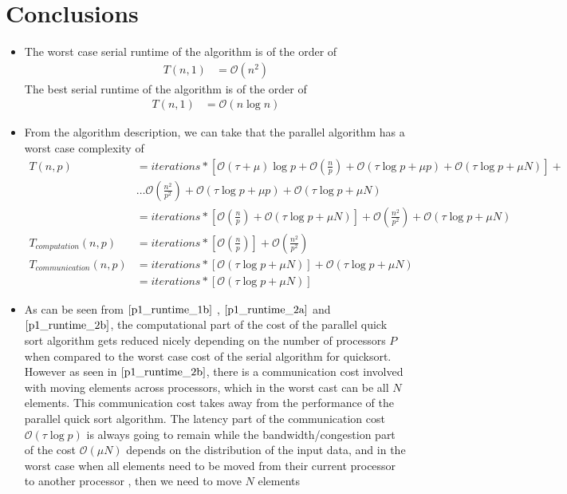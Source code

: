 \documentclass[twoside,11pt]{article}\usepackage{amsmath,amsfonts,amsthm,fullpage}
\begin{document}
\section{Conclusions}
\begin{itemize}
\item
The worst case serial runtime of the algorithm is of the order of
\begin{align}
T(n,1) &= \mathcal{O}(n^2)\label{p1_runtime_1}
\end{align}
The best serial runtime of the algorithm is of the order of
\begin{align}
T(n,1) &= \mathcal{O}(n \log n)\label{p1_runtime_1b}
\end{align}
\item
From the algorithm description, we can take that the parallel algorithm has a worst case complexity of
\begin{align}
T(n,p) &= iterations*[\mathcal{O}(\tau + \mu )\log p + \mathcal{O}(\frac{n}{p}) + \mathcal{O}(\tau \log p + \mu p ) +  \mathcal{O}(\tau \log p + \mu N )] + \nonumber\\
 &\dots \mathcal{O} (\frac{n^2}{p^2}) + \mathcal{O}(\tau \log p + \mu p ) + \mathcal{O}(\tau \log p + \mu N ) \nonumber\\
 &= iterations*[\mathcal{O}(\frac{n}{p}) + \mathcal{O}(\tau \log p + \mu N )] +  \mathcal{O} (\frac{n^2}{p^2}) + \mathcal{O}(\tau \log p + \mu N ) \label{p1_runtime_2}\\
 T_{computation}(n,p) &= iterations*[\mathcal{O}(\frac{n}{p}) ] +  \mathcal{O} (\frac{n^2}{p^2}) \label{p1_runtime_2a}\\
 T_{communication}(n,p) &= iterations*[\mathcal{O}(\tau \log p + \mu N )] + \mathcal{O}(\tau \log p + \mu N )\nonumber\\
 & =  iterations*[\mathcal{O}(\tau \log p + \mu N )] \label{p1_runtime_2b}
\end{align}
\item
As can be seen from $\eqref{p1_runtime_1b}$ , $\eqref{p1_runtime_2a}$ and $\eqref{p1_runtime_2b}$, the computational part of the cost of the parallel quick sort algorithm gets reduced nicely  depending on the number of processors $P$ when compared to the worst case cost of the serial algorithm for quicksort. However as seen in $\eqref{p1_runtime_2b}$, there is a communication cost involved with moving elements across processors, which in the worst cast can be all $N$ elements. This communication cost takes away from the performance of the parallel quick sort algorithm. The latency part of the communication cost $\mathcal{O}(\tau \log p )$ is always going to remain while the bandwidth/congestion part of the cost $\mathcal{O}(\mu N )$ depends on the distribution of the input data, and in the worst case when all elements need to be moved from their current processor to another processor , then we need to move $N$ elements

\end{itemize}
\end{document}
